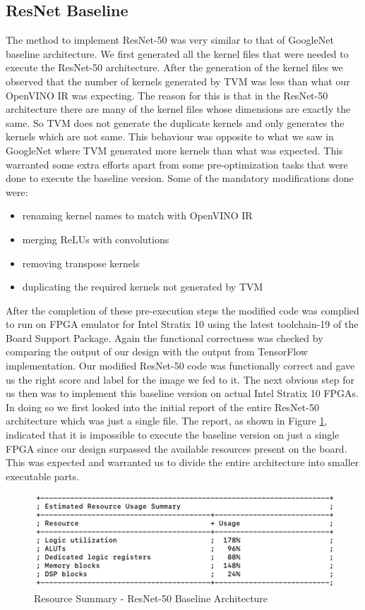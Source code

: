 \subsection{ResNet Baseline}
The method to implement ResNet-50 was very similar to that of GoogleNet baseline architecture. We first generated all the kernel files that were needed to execute the ResNet-50 architecture. After the generation of the kernel files we observed that the number of kernels generated by TVM was less than what our OpenVINO IR was expecting. The reason for this is that in the ResNet-50 architecture there are many of the kernel files whose dimensions are exactly the same. So TVM does not generate the duplicate kernels and only generates the kernels which are not same. This behaviour was opposite to what we saw in GoogleNet where TVM generated more kernels than what was expected. This warranted some extra efforts apart from some pre-optimization tasks that were done to execute the baseline version.
Some of the mandatory modifications done were:
\begin{itemize}
    \item renaming kernel names to match with OpenVINO IR
    \item merging ReLUs with convolutions
    \item removing transpose kernels
    \item duplicating the required kernels not generated by TVM
\end{itemize}
 After the completion of these pre-execution steps the modified code was complied to run on FPGA emulator for Intel Stratix 10 using the latest toolchain-19 of the Board Support Package. Again the functional correctness was checked by comparing the output of our design with the output from TensorFlow implementation. Our modified ResNet-50 code was functionally correct and gave us the right score and label for the image we fed to it. The next obvious step for us then was to implement this baseline version on actual Intel Stratix 10 FPGAs.
 \newline
 In doing so we first looked into the initial report of the entire ResNet-50 architecture which was just a single file. The report, as shown in Figure \ref{fig:ResNet50_baseline_report}, indicated that it is impossible to execute the baseline version on just a single FPGA since our design surpassed the available resources present on the board. This was expected and warranted us to divide the entire architecture into smaller executable parts.
 
 \begin{figure}[!htb]
  \includegraphics[width=\textwidth,height=\textheight,keepaspectratio]{img/ResNet_baseline.png}
  \caption{Resource Summary - ResNet-50 Baseline Architecture}
  \label{fig:ResNet50_baseline_report}
\end{figure}

